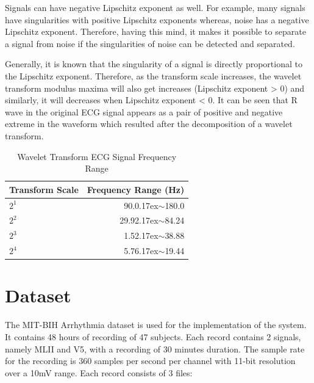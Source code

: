 Signals can have negative Lipschitz exponent as well. For example, many signals have singularities with positive Lipschitz exponents whereas, noise has a negative Lipschitz exponent. Therefore, having this mind, it makes it possible to separate a signal from noise if the singularities of noise can be detected and separated.

Generally, it is known that the singularity of a signal is directly proportional to the Lipschitz exponent. Therefore, as the transform scale increases, the wavelet transform modulus maxima will also get increases (Lipschitz exponent > 0) and similarly, it will decreases when Lipschitz exponent < 0. It can be seen that R wave in the original ECG signal appears as a pair of positive and negative extreme in the waveform which resulted after the decomposition of a wavelet transform.



\renewcommand{\arraystretch}{2}
\begin{table}
	\caption{Wavelet Transform ECG Signal Frequency Range} \label{tab:sometab}
	
	\begin{center}
		\begin{tabular}{ | l | r | }
			\hline
			Transform Scale & Frequency Range (Hz) \\ \hline
			${2^1}$  & 90.0{\raise.17ex\hbox{$\scriptstyle\sim$}}180.0 \\ \hline
			${2^2}$  & 29.92{\raise.17ex\hbox{$\scriptstyle\sim$}}84.24  \\ \hline
			${2^3}$  & 1.52{\raise.17ex\hbox{$\scriptstyle\sim$}}38.88  \\ \hline
			${2^4}$  & 5.76{\raise.17ex\hbox{$\scriptstyle\sim$}}19.44  \\ 
			\hline
		\end{tabular}
	\end{center}
	
\end{table}


\section{Dataset}

The MIT-BIH Arrhythmia dataset is used for the implementation of the system. It contains 48 hours of recording of 47 subjects. Each record contains 2 signals, namely MLII and V5, with a recording of 30 minutes duration. The sample rate for the recording is 360 samples per second per channel with 11-bit resolution over a 10mV range. Each record consists of 3 files:

